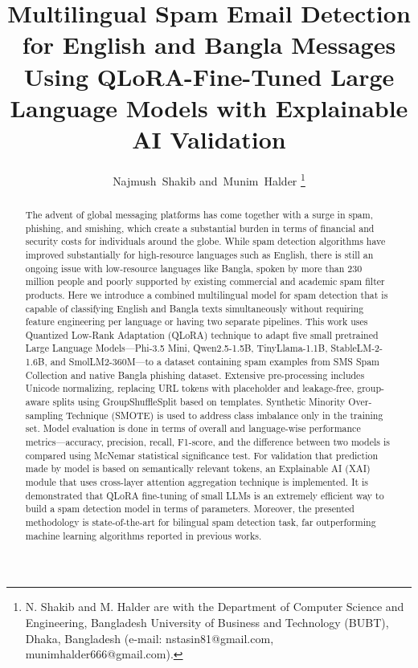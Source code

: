 \documentclass[journal]{IEEEtran}
\begin{document}
\title{Multilingual Spam Email Detection for English and Bangla Messages Using QLoRA-Fine-Tuned Large Language Models with Explainable AI Validation}

\author{Najmush~Shakib
        and~Munim~Halder%
\thanks{N. Shakib and M. Halder are with the Department of Computer Science and Engineering, Bangladesh University of Business and Technology (BUBT), Dhaka, Bangladesh (e-mail: nstasin81@gmail.com, munimhalder666@gmail.com).}%
}

\maketitle

\begin{abstract}
\normalfont
The advent of global messaging platforms has come together with a surge in spam, phishing, and smishing, which create a substantial burden in terms of financial and security costs for individuals around the globe. While spam detection algorithms have improved substantially for high-resource languages such as English, there is still an ongoing issue with low-resource languages like Bangla, spoken by more than 230 million people and poorly supported by existing commercial and academic spam filter products. Here we introduce a combined multilingual model for spam detection that is capable of classifying English and Bangla texts simultaneously without requiring feature engineering per language or having two separate pipelines. This work uses Quantized Low-Rank Adaptation (QLoRA) technique to adapt five small pretrained Large Language Models---Phi-3.5 Mini, Qwen2.5-1.5B, TinyLlama-1.1B, StableLM-2-1.6B, and SmolLM2-360M---to a dataset containing spam examples from SMS Spam Collection and native Bangla phishing dataset. Extensive pre-processing includes Unicode normalizing, replacing URL tokens with placeholder and leakage-free, group-aware splits using GroupShuffleSplit based on templates. Synthetic Minority Over-sampling Technique (SMOTE) is used to address class imbalance only in the training set. Model evaluation is done in terms of overall and language-wise performance metrics---accuracy, precision, recall, F1-score, and the difference between two models is compared using McNemar statistical significance test. For validation that prediction made by model is based on semantically relevant tokens, an Explainable AI (XAI) module that uses cross-layer attention aggregation technique is implemented. It is demonstrated that QLoRA fine-tuning of small LLMs is an extremely efficient way to build a spam detection model in terms of parameters. Moreover, the presented methodology is state-of-the-art for bilingual spam detection task, far outperforming machine learning algorithms reported in previous works.
\end{abstract}
\end{document}
